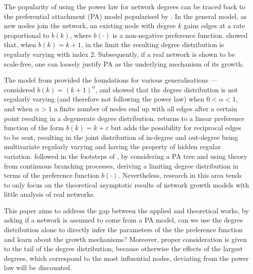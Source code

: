 \documentclass[
  sn-basic,
  10pt,
]{sn-jnl}
\theoremstyle{plain}
\theoremstyle{plain}
\theoremstyle{remark}
\begin{document}
The popularity of using the power law for network degrees can be traced
back to the preferential attachment (PA) model popularised by
\citet{Barabasi99}. In the general model, as new nodes join the network,
an existing node with degree \(k\) gains edges at a rate proportional to
\(b(k)\), where \(b(\cdot)\) is a non-negative preference function.
\citet{Barabasi99} showed that, when \(b(k) = k + 1\), in the limit the
resulting degree distribution is regularly varying with index 2.
Subsequently, if a real network is shown to be scale-free, one can
loosely justify PA as the underlying mechanism of its growth.

The model from \citet{Barabasi99} provided the foundations for various
generalisations --- \citet{krapivsky01} considered
\(b(k) = (k+1)^\alpha\), and showed that the degree distribution is not
regularly varying (and therefore not following the power law) when
\(0<\alpha<1\), and when \(\alpha>1\) a finite number of nodes end up
with all edges after a certain point resulting in a degenerate degree
distribution. \citet{wang2022random} returns to a linear preference
function of the form \(b(k) = k+\varepsilon\) but adds the possibility
for reciprocal edges to be sent, resulting in the joint distribution of
in-degree and out-degree being multivariate regularly varying and having
the property of hidden regular variation. \citet{rudas07} followed in
the footsteps of \citet{krapivsky01}, by considering a PA tree and using
theory from continuous branching processes, deriving a limiting degree
distribution in terms of the preference function \(b(\cdot)\).
Nevertheless, research in this area tends to only focus on the
theoretical asymptotic results of network growth models with little
analysis of real networks.

This paper aims to address the gap between the applied and theoretical
works, by asking if a network is assumed to come from a PA model, can we
use the degree distribution alone to directly infer the parameters of
the the preference function and learn about the growth mechanisms?
Moreover, proper consideration is given to the tail of the degree
distribution, because otherwise the effects of the largest degrees,
which correspond to the most influential nodes, deviating from the power
law will be discounted.
\end{document}
